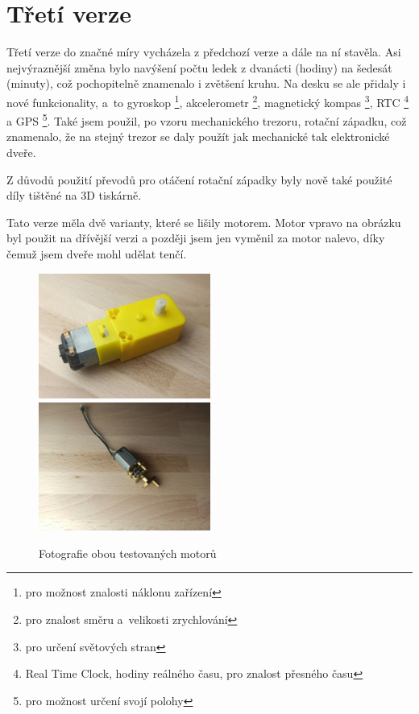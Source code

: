 \section{Třetí verze}
\label{E3-vyvoj}

Třetí verze do značné míry vycházela z předchozí verze a dále na ní stavěla. Asi nejvýraznější změna bylo navýšení počtu 
ledek z dvanácti (hodiny) na šedesát (minuty), což pochopitelně znamenalo i zvětšení kruhu. Na desku se ale přidaly i nové funkcionality,
a~to gyroskop \footnote{pro možnost znalosti náklonu zařízení}, akcelerometr \footnote{pro znalost směru a~velikosti zrychlování}, magnetický kompas \footnote{pro určení světových
stran}, RTC \footnote{Real Time Clock, hodiny reálného času, pro znalost přesného času} a GPS \footnote{pro možnost určení svojí polohy}.
Také jsem použil, po vzoru mechanického trezoru, rotační západku, což znamenalo, že na stejný trezor se daly použít jak mechanické tak 
elektronické dveře.

Z důvodů použití převodů pro otáčení rotační západky byly nově také použité díly tištěné na 3D tiskárně. 

Tato verze měla dvě varianty, které se lišily motorem.
Motor vpravo na obrázku  byl použit na dřívější verzi a později jsem jen vyměnil za motor nalevo, díky čemuž jsem dveře mohl udělat tenčí. %
\begin{figure}[htbp]
    \centering
    \includegraphics[width=160pt]{kapitoly/obrazky/E3/motory/zluty_motor.jpg}
    \includegraphics[width=160pt]{kapitoly/obrazky/E3/motory/hodinovyStrojek.jpg}
    \caption{Fotografie obou testovaných motorů} 
    \label{fig:E3-motory}
\end{figure}

\newpage
